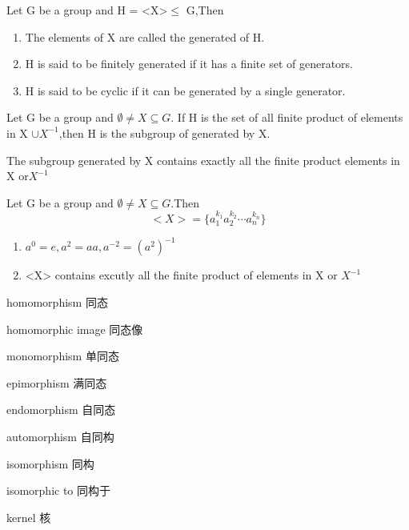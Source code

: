 \documentclass[cn,10pt,math=newtx,citestyle=gb7714-2015,bibstyle=gb7714-2015]{elegantbook}
\begin{document}
\begin{definition}
    Let G be a group and H = <X>$\leq$ G,Then
    \begin{enumerate}
        \item The elements of X are called the generated of H.
        \item H is said to be finitely generated if it has a finite set of generators.
        \item H is said to be cyclic if it can be generated by a single generator.
    \end{enumerate}
\end{definition}


\begin{theorem}
    Let G be a group and $\emptyset \neq X \subseteq G$. If H is the set of all finite product of elements in X $\cup X^{-1}$,then H is the subgroup of generated by X.
\end{theorem}
\begin{note}
    The subgroup generated by X contains exactly all the finite product elements in X or$ X^{-1}$
\end{note}

\begin{theorem}
    Let G be a group and $\emptyset \neq X\subseteq G$.Then
    \begin{equation*}
        <X>=\{a_1^{k_1}a_2^{k_2}\cdots a_n^{k_n}\}
    \end{equation*}
    \begin{enumerate}
        \item $a^0=e,a^2=aa,a^{-2}=(a^2)^{-1}$
        \item <X> contains excutly all the finite product of elements in X or $X^{-1}$
    \end{enumerate}
\end{theorem}
\newpage
\begin{introduction}[Keywords]
    \item homomorphism 同态
    \item  homomorphic image 同态像
\item  monomorphism 单同态
\item  epimorphism 满同态
\item  endomorphism 自同态
\item automorphism 自同构
\item isomorphism 同构
\item  isomorphic to 同构于
\item  kernel 核
\end{introduction}
\end{document}
